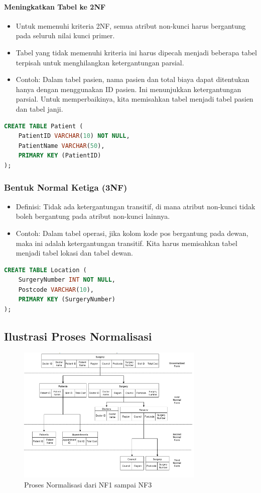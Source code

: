 \documentclass{article}
\begin{document}
\paragraph{Meningkatkan Tabel ke 2NF}
\begin{itemize}
    \item Untuk memenuhi kriteria 2NF, semua atribut non-kunci harus bergantung pada seluruh nilai kunci primer.
    \item Tabel yang tidak memenuhi kriteria ini harus dipecah menjadi beberapa tabel terpisah untuk menghilangkan ketergantungan parsial.
    \item Contoh: Dalam tabel pasien, nama pasien dan total biaya dapat ditentukan hanya dengan menggunakan ID pasien. Ini menunjukkan ketergantungan parsial. Untuk memperbaikinya, kita memisahkan tabel menjadi tabel pasien dan tabel janji.
\end{itemize}
\begin{lstlisting}[language=SQL, caption={SQL untuk Membuat Tabel Pasien Baru (Memenuhi 2NF)}, captionpos=b]
CREATE TABLE Patient (
    PatientID VARCHAR(10) NOT NULL,
    PatientName VARCHAR(50),
    PRIMARY KEY (PatientID)
);
\end{lstlisting}

\subsubsection{Bentuk Normal Ketiga (3NF)}
\begin{itemize}
    \item Definisi: Tidak ada ketergantungan transitif, di mana atribut non-kunci tidak boleh bergantung pada atribut non-kunci lainnya.
    \item Contoh: Dalam tabel operasi, jika kolom kode pos bergantung pada dewan, maka ini adalah ketergantungan transitif. Kita harus memisahkan tabel menjadi tabel lokasi dan tabel dewan.
\end{itemize}
\begin{lstlisting}[language=SQL, caption={SQL untuk Membuat Tabel Lokasi (Memenuhi 3NF)}, captionpos=b]
CREATE TABLE Location (
    SurgeryNumber INT NOT NULL,
    Postcode VARCHAR(10),
    PRIMARY KEY (SurgeryNumber)
);
\end{lstlisting}

\subsection{Ilustrasi Proses Normalisasi}
\begin{figure}[H]
    \centering
    \includegraphics[width=0.8\textwidth]{normalisas-nf1-sampai-nf3.png}
    \caption{Proses Normalisasi dari NF1 sampai NF3}
\end{figure}
\end{document}
